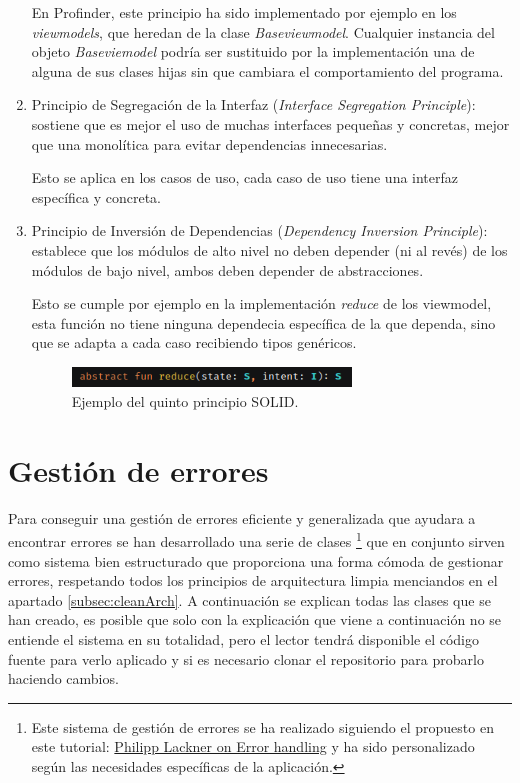 \begin{enumerate}
    En Profinder, este principio ha sido implementado por ejemplo en los \textit{viewmodels}, que heredan de la clase \textit{Baseviewmodel}. Cualquier instancia del objeto \textit{Baseviemodel} podría ser sustituido por la implementación una de alguna de sus clases hijas sin que cambiara el comportamiento del programa.
    \item Principio de Segregación de la Interfaz (\textit{Interface Segregation Principle}):  sostiene que es mejor el uso de muchas interfaces pequeñas y concretas, mejor que una monolítica para evitar dependencias innecesarias.
    
    Esto se aplica en los casos de uso, cada caso de uso tiene una interfaz específica y concreta.
    \item Principio de Inversión de Dependencias (\textit{Dependency Inversion Principle}): establece que los módulos de alto nivel no deben depender (ni al revés) de los módulos de bajo nivel, ambos deben depender de abstracciones.
    
    Esto se cumple por ejemplo en la implementación \textit{reduce} de los viewmodel, esta función no tiene ninguna dependecia específica de la que dependa, sino que se adapta a cada caso recibiendo tipos genéricos.
    \begin{figure}[h]
        \centering
        \includegraphics[width = 0.7\textwidth]{Imagenes/Fuentes/ejemplo_reduce.png}
        \caption{Ejemplo del quinto principio SOLID.}
        \label{fig:ejemplo_reduce}
    \end{figure}
\end{enumerate}

\section{Gestión de errores} 
Para conseguir una gestión de errores eficiente y generalizada que ayudara a encontrar errores se han desarrollado una serie de clases
\footnote{Este sistema de gestión de errores se ha realizado siguiendo el propuesto en este tutorial: \href{https://www.youtube.com/watch?v=MiLN2vs2Oe0}{Philipp Lackner on Error handling} y ha sido personalizado según las necesidades específicas de la aplicación.}
que en conjunto sirven como sistema bien estructurado que proporciona una forma cómoda de gestionar errores, respetando todos los principios de arquitectura limpia menciandos en el apartado \ref{subsec:cleanArch}. A continuación se explican todas las clases que se han creado, es posible que solo con la explicación que viene a continuación no se entiende el sistema en su totalidad, pero el lector tendrá disponible el código fuente para verlo aplicado y si es necesario clonar el repositorio para probarlo haciendo cambios.

